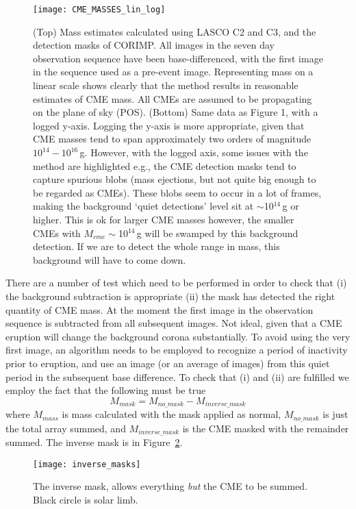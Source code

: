 %
%
\begin{figure}[h!]
\begin{center}
\texttt{[image: CME\_MASSES\_lin\_log]}
\caption[CME Mass automatic detection]{(Top) Mass estimates calculated using LASCO C2 and C3, and the detection masks of CORIMP. All images in the seven day observation sequence have been base-differenced, with the first image in the sequence used as a pre-event image. Representing mass on a linear scale shows clearly that the method results in reasonable estimates of CME mass. All CMEs are assumed to be propagating on the plane of sky (POS). 
(Bottom) Same data as Figure 1, with a logged y-axis. Logging the y-axis is more appropriate, given that CME masses tend to span approximately two orders of magnitude $10^{14}-10^{16}$\,g. However, with the logged axis, some issues with the method are highlighted e.g., the CME detection masks tend to capture spurious blobs (mass ejections, but not quite big enough to be regarded as CMEs). These blobs seem to occur in a lot of frames, making the background `quiet detections' level sit at $\sim$10$^{14}$\,g or higher. This is ok for larger CME masses however, the smaller CMEs with $M_{cme}\sim$10$^{14}$\,g will be swamped by this background detection. If we are to detect the whole range in mass, this background will have to come down. }
\label{fig:mass_v_time}
\end{center}
\end{figure}
%
%
%
%
There are a number of test which need to be performed in order to check that (i) the background subtraction is appropriate (ii) the mask has detected the right quantity of CME mass. At the moment the first image in the observation sequence is subtracted from all subsequent images. Not ideal, given that a CME eruption will change the background corona substantially. To avoid using the very first image, an algorithm needs to be employed to recognize a period of inactivity prior to eruption, and use an image (or an average of images) from this quiet period in the subsequent base difference.
%
To check that (i) and (ii) are fulfilled we employ the fact that the following must be true
\begin{equation}
M_{mask} = M_{no\_mask} - M_{inverse\_mask}
\end{equation}
where $M_{mass}$ is mass calculated with the mask applied as normal, $M_{no\_mask}$ is just the total array summed, and $M_{inverse\_mask}$ is the CME masked with the remainder summed. The inverse mask is in Figure~\ref{fig:inverse_masks}. 
\begin{figure}[t!]
\begin{center}
\texttt{[image: inverse\_masks]}
\caption{The inverse mask, allows everything \emph{but} the CME to be summed. Black circle is solar limb.}
\label{fig:inverse_masks}
\end{center}
\end{figure}

